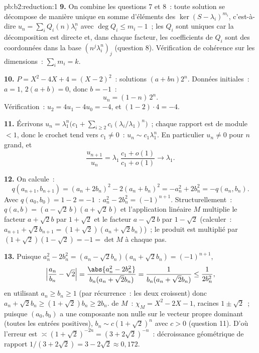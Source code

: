 \begin{solution}{pb:b2:reduction:1}
\textbf{9.} On combine les questions 7 et 8~: toute solution se
décompose de manière unique en somme d'éléments des $\ker(S -
\lambda_i)^{m_i}$, c'est-à-dire $u_n = \sum_i Q_i(n)\lambda_i^n$ avec
$\deg Q_i \leq m_i - 1$~; les $Q_i$ sont uniques car la décomposition
est directe et, dans chaque facteur, les coefficients de $Q_i$ sont
des coordonnées dans la base $(n^j\lambda_i^n)_j$ (question 8).
Vérification de cohérence sur les dimensions~: $\sum_i m_i = k$.

\textbf{10.} $P = X^2 - 4X + 4 = (X - 2)^2$~: solutions $(a +
bn)2^n$. Données initiales~: $a = 1$, $2(a + b) = 0$, donc $b = -1$~:
\[
u_n = (1 - n)\,2^n .
\]
Vérification~: $u_2 = 4u_1 - 4u_0 = -4$, et $(1 - 2)\cdot4 = -4$.

\textbf{11.} Écrivons $u_n = \lambda_1^n\bigl(c_1 + \sum_{i\geq2}
c_i(\lambda_i/\lambda_1)^n\bigr)$~; chaque rapport est de module $<
1$, donc le crochet tend vers $c_1 \neq 0$~: $u_n \sim c_1\lambda_1^n$.
En particulier $u_n \neq 0$ pour $n$ grand, et
\[
\frac{u_{n+1}}{u_n} =
\lambda_1\,\frac{c_1 + o(1)}{c_1 + o(1)} \longrightarrow
\lambda_1 .
\]

\textbf{12.} On calcule~:
\[
q(a_{n+1}, b_{n+1}) = (a_n + 2b_n)^2 - 2(a_n + b_n)^2
= -a_n^2 + 2b_n^2 = -q(a_n, b_n).
\]
Avec $q(a_0, b_0) = 1 - 2 = -1$~: $a_n^2 - 2b_n^2 = (-1)^{n+1}$.
Structurellement~: $q(a, b) = (a - \sqrt2\,b)(a + \sqrt2\,b)$ et
l'application linéaire $M$ multiplie le facteur $a + \sqrt2 b$ par $1 +
\sqrt2$ et le facteur $a - \sqrt2 b$ par $1 - \sqrt2$ (calculer~:
$a_{n+1} + \sqrt2 b_{n+1} = (1 + \sqrt2)(a_n + \sqrt2 b_n)$)~; le
produit est multiplié par $(1 + \sqrt2)(1 - \sqrt2) = -1 = \det M$ à
chaque pas.

\textbf{13.} Puisque $a_n^2 - 2b_n^2 = (a_n - \sqrt2 b_n)(a_n +
\sqrt2 b_n) = (-1)^{n+1}$,
\[
\Bigl|\frac{a_n}{b_n} - \sqrt2\Bigr|
= \frac{\abs{a_n^2 - 2b_n^2}}{b_n(a_n + \sqrt2 b_n)}
= \frac{1}{b_n(a_n + \sqrt2 b_n)} \leq \frac1{2b_n^2},
\]
en utilisant $a_n \geq b_n \geq 1$ (par récurrence~: les deux
croissent) donc $a_n + \sqrt2 b_n \geq (1 + \sqrt2)b_n \geq 2b_n$.
 de $M$~: $\chi_M = X^2 - 2X - 1$, racines $1 \pm
\sqrt2$~; puisque $(a_0, b_0)$ a une composante non nulle sur le
vecteur propre dominant (toutes les entrées positives), $b_n \sim c(1
+ \sqrt2)^n$ avec $c > 0$ (question 11). D'où l'erreur est $\asymp (1
+ \sqrt2)^{-2n} = (3 + 2\sqrt2)^{-n}$~: décroissance géométrique de
rapport $1/(3 + 2\sqrt2) = 3 - 2\sqrt2 \approx 0{,}172$.


\end{solution}
